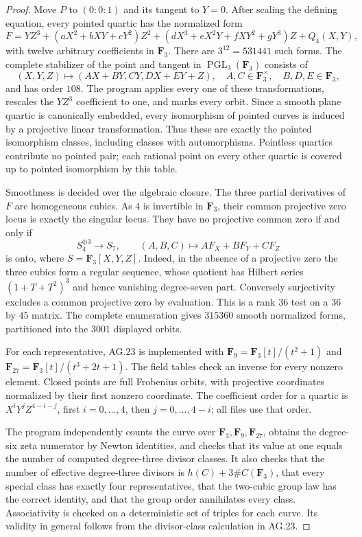 \begin{proof}
Move $P$ to $(0:0:1)$ and its tangent to $Y=0$.
After scaling the defining equation, every pointed quartic
has the normalized form
\[
 F=YZ^3+(aX^2+bXY+cY^2)Z^2
       +(dX^3+eX^2Y+fXY^2+gY^3)Z+Q_4(X,Y),
\]
with twelve arbitrary coefficients in $\mathbf F_3$.
There are $3^{12}=531441$ such forms. The complete
stabilizer of the point and tangent in
$\operatorname{PGL}_3(\mathbf F_3)$ consists of
\[
 (X,Y,Z)\longmapsto(AX+BY,CY,DX+EY+Z),
 \quad A,C\in\mathbf F_3^\times,
 \quad B,D,E\in\mathbf F_3,
\]
and has order $108$. The program applies every one of
these transformations, rescales the $YZ^3$ coefficient
to one, and marks every orbit. Since a smooth plane
quartic is canonically embedded, every isomorphism of
pointed curves is induced by a projective linear
transformation. Thus these are exactly the pointed
isomorphism classes, including classes with automorphisms.
Pointless quartics contribute no pointed pair; each rational
point on every other quartic is covered up to pointed
isomorphism by this table.

Smoothness is decided over the algebraic closure. The three
partial derivatives of $F$ are homogeneous cubics. As
$4$ is invertible in $\mathbf F_3$, their common
projective zero locus is exactly the singular locus.
They have no projective common zero if and only if
\[
  S_4^{\oplus3}\longrightarrow S_7,
  \qquad(A,B,C)\longmapsto AF_X+BF_Y+CF_Z
\]
is onto, where $S=\mathbf F_3[X,Y,Z]$.
Indeed, in the absence of a projective zero the three
cubics form a regular sequence, whose quotient has
Hilbert series $(1+T+T^2)^3$ and hence vanishing
degree-seven part. Conversely surjectivity excludes a
common projective zero by evaluation. This is a rank
$36$ test on a $36$ by $45$ matrix. The complete
enumeration gives $315360$ smooth normalized forms,
partitioned into the $3001$ displayed orbits.

For each representative, AG.23 is implemented with
$\mathbf F_9=\mathbf F_3[t]/(t^2+1)$ and
$\mathbf F_{27}=\mathbf F_3[t]/(t^3+2t+1)$.
The field tables check an inverse for every nonzero
element. Closed points are full Frobenius orbits,
with projective coordinates normalized by their first
nonzero coordinate. The coefficient order for a quartic
is $X^iY^jZ^{4-i-j}$, first $i=0,\ldots,4$, then
$j=0,\ldots,4-i$; all files use that order.

The program independently counts the curve over
$\mathbf F_3,\mathbf F_9,\mathbf F_{27}$, obtains
the degree-six zeta numerator by Newton identities,
and checks that its value at one equals the number
of computed degree-three divisor classes. It also
checks that the number of effective degree-three
divisors is $h(C)+3\#C(\mathbf F_3)$, that every
special class has exactly four representatives,
that the two-cubic group law has the correct identity,
and that the group order annihilates every class.
Associativity is checked on a deterministic set of
triples for each curve. Its validity in general follows
from the divisor-class calculation in AG.23.


\end{proof}
